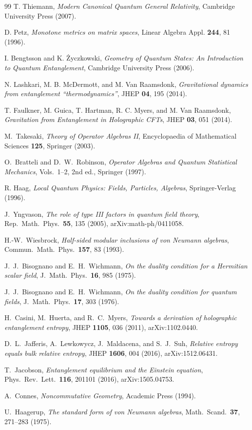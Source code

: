 \documentclass[12pt,a4paper]{article}
\begin{document}
\begin{thebibliography}{99}
T. Thiemann, \emph{Modern Canonical Quantum General Relativity}, Cambridge University Press (2007).

D. Petz, \emph{Monotone metrics on matrix spaces}, Linear Algebra Appl. \textbf{244}, 81 (1996).

I. Bengtsson and K. \.Zyczkowski, \emph{Geometry of Quantum States: An Introduction to Quantum Entanglement}, Cambridge University Press (2006).

N. Lashkari, M. B. McDermott, and M. Van Raamsdonk, \emph{Gravitational dynamics from entanglement ``thermodynamics''}, JHEP \textbf{04}, 195 (2014).

T. Faulkner, M. Guica, T. Hartman, R. C. Myers, and M. Van Raamsdonk, \emph{Gravitation from Entanglement in Holographic CFTs}, JHEP \textbf{03}, 051 (2014).

M.~Takesaki,
\emph{Theory of Operator Algebras II},
Encyclopaedia of Mathematical Sciences \textbf{125}, Springer (2003).

O.~Bratteli and D.~W.~Robinson,
\emph{Operator Algebras and Quantum Statistical Mechanics},
Vols.\ 1--2, 2nd ed., Springer (1997).

R. Haag, \emph{Local Quantum Physics: Fields, Particles, Algebras}, Springer-Verlag (1996).

J.~Yngvason,
\emph{The role of type III factors in quantum field theory},
Rep.\ Math.\ Phys.\ \textbf{55}, 135 (2005),
arXiv:math-ph/0411058.

H.-W.~Wiesbrock,
\emph{Half-sided modular inclusions of von Neumann algebras},
Commun.\ Math.\ Phys.\ \textbf{157}, 83 (1993).

J.~J.~Bisognano and E.~H.~Wichmann,
\emph{On the duality condition for a Hermitian scalar field},
J.\ Math.\ Phys.\ \textbf{16}, 985 (1975).

J.~J.~Bisognano and E.~H.~Wichmann,
\emph{On the duality condition for quantum fields},
J.\ Math.\ Phys.\ \textbf{17}, 303 (1976).

H.~Casini, M.~Huerta, and R.~C.~Myers,
\emph{Towards a derivation of holographic entanglement entropy},
JHEP \textbf{1105}, 036 (2011),
arXiv:1102.0440.

D.~L.~Jafferis, A.~Lewkowycz, J.~Maldacena, and S.~J.~Suh,
\emph{Relative entropy equals bulk relative entropy},
JHEP \textbf{1606}, 004 (2016),
arXiv:1512.06431.

T.~Jacobson,
\emph{Entanglement equilibrium and the Einstein equation},
Phys.\ Rev.\ Lett.\ \textbf{116}, 201101 (2016),
arXiv:1505.04753.

A.~Connes, \emph{Noncommutative Geometry}, Academic Press (1994).

U.~Haagerup,
\emph{The standard form of von Neumann algebras},
Math.\ Scand.\ \textbf{37}, 271--283 (1975).

\end{thebibliography}
\end{document}
